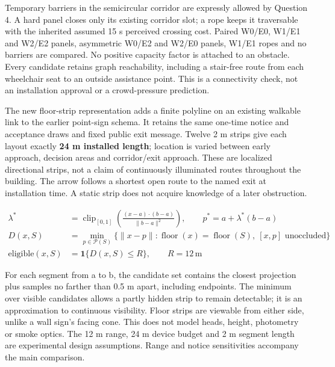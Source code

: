 \documentclass[11pt,a4paper]{article}
\begin{document}
Temporary barriers in the semicircular corridor are expressly allowed by Question 4. A hard panel closes only its existing corridor slot; a rope keeps it traversable with the inherited assumed 15 s perceived crossing cost. Paired W0/E0, W1/E1 and W2/E2 panels, asymmetric W0/E2 and W2/E0 panels, W1/E1 ropes and no barriers are compared. No positive capacity factor is attached to an obstacle. Every candidate retains graph reachability, including a stair-free route from each wheelchair seat to an outside assistance point. This is a connectivity check, not an installation approval or a crowd-pressure prediction.


The new floor-strip representation adds a finite polyline on an existing walkable link to the earlier point-sign schema. It retains the same one-time notice and acceptance draws and fixed public exit message. Twelve 2 m strips give each layout exactly \textbf{24 m installed length}; location is varied between early approach, decision areas and corridor/exit approach. These are localized directional strips, not a claim of continuously illuminated routes throughout the building. The arrow follows a shortest open route to the named exit at installation time. A static strip does not acquire knowledge of a later obstruction.


\begin{equation}
\begin{aligned}
\lambda^*&=\operatorname{clip}_{[0,1]}\!\left(\frac{(x-a)\cdot(b-a)}{\lVert b-a\rVert^2}\right),\qquad
p^*=a+\lambda^*(b-a) \\
D(x,S)&=\min_{p\in\mathcal P(S)}\{\lVert x-p\rVert:\operatorname{floor}(x)=\operatorname{floor}(S),\ [x,p]\text{ unoccluded}\} \\
\text{eligible}(x,S)&=\mathbf 1\{D(x,S)\le R\},\qquad R=12\,\mathrm m
\end{aligned}
\tag{25}\label{eq:25}
\end{equation}

For each segment from a to b, the candidate set contains the closest projection plus samples no farther than 0.5 m apart, including endpoints. The minimum over visible candidates allows a partly hidden strip to remain detectable; it is an approximation to continuous visibility. Floor strips are viewable from either side, unlike a wall sign's facing cone. This does not model heads, height, photometry or smoke optics. The 12 m range, 24 m device budget and 2 m segment length are experimental design assumptions. Range and notice sensitivities accompany the main comparison.
\end{document}
